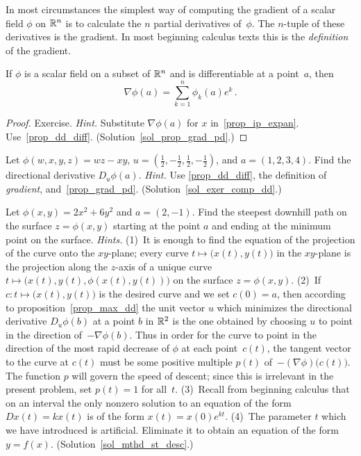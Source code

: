 In most circumstances the simplest way of computing the gradient of a scalar field $\phi$ on
$\mathbb{R}^n$ is to calculate the $n$ partial derivatives of~$\phi$.  The $n$-tuple of these
derivatives is the gradient.  In most beginning calculus texts this is the \emph{definition}
of the gradient.

\begin{prop}\label{prop_grad_pd} If $\phi$ is a scalar field on a subset of $\mathbb{R}^n$ and is
differentiable at a point~$a$, then
  \[ \nabla\phi(a) = \sum_{k=1}^n\phi_k(a) e^k\,. \]
\end{prop}

\begin{proof}  Exercise.  \emph{Hint.}  Substitute $\nabla\phi(a)$ for $x$
in~\ref{prop_ip_expan}.  Use~\ref{prop_dd_diff}.  (Solution~\ref{sol_prop_grad_pd}.) \ns
\end{proof}

\begin{exer}\label{exer_comp_dd}  Let $\phi(w,x,y,z) = wz - xy$, $u = (\frac12, -\frac12,
\frac12, -\frac12)$, and $a = (1,2,3,4)$. Find the directional derivative $D_u\phi(a)$.
\emph{Hint.}  Use \ref{prop_dd_diff}, the definition of \emph{gradient},
and~\ref{prop_grad_pd}.   (Solution~\ref{sol_exer_comp_dd}.)
\end{exer}

\begin{exer}\label{mthd_st_desc}  Let $\phi(x,y) = 2x^2 + 6y^2$
and $a = (2,-1)$.  Find the steepest downhill path on the surface $z = \phi(x,y)$ starting at
the point $a$ and ending at the minimum point on the surface.  \emph{Hints.} (1)~It is enough
to find the equation of the projection of the curve onto the $xy$-plane; every curve $t
\mapsto \bigl(x(t),y(t)\bigr)$ in the $xy$-plane is the projection along the $z$-axis of a
unique curve $t \mapsto \bigl(x(t),y(t),\phi(x(t),y(t))\bigr)$ on the surface $z = \phi(x,y)$.
(2)~If $c\colon t \mapsto \bigl(x(t),y(t)\bigr)$ is the desired curve and we set $c(0) = a$,
then according to proposition~\ref{prop_max_dd} the unit vector $u$ which minimizes the
directional derivative $D_u\phi(b)$ at a point $b$ in $\mathbb{R}^2$ is the one obtained by choosing
$u$ to point in the direction of~$-\nabla\phi(b)$.  Thus in order for the curve to point in
the direction of the most rapid decrease of $\phi$ at each point~$c(t)$, the tangent vector to
the curve at $c(t)$ must be some positive multiple $p(t)$ of~$-(\nabla\phi)\bigl(c(t)\bigr)$.
The function $p$ will govern the speed of descent; since this is irrelevant in the present
problem, set $p(t) = 1$ for all~$t$. (3)~Recall from beginning calculus that on an interval
the only nonzero solution to an equation of the form $Dx(t) = kx(t)$ is of the form $x(t) =
x(0)e^{kt}$.  (4)~The parameter $t$ which we have introduced is artificial.  Eliminate it to
obtain an equation of the form $y = f(x)$.  (Solution~\ref{sol_mthd_st_desc}.)
\end{exer}

